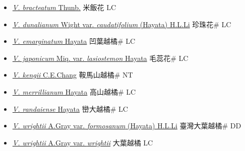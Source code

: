 \begin{itemize}
  \begin{itemize}
        \item[] \href{http://www.theplantlist.org/tpl1.1/search?q=Vaccinium+bracteatum}{\textit{V. bracteatum} Thunb.}   米飯花 LC
        \item[] \href{http://www.theplantlist.org/tpl1.1/search?q=Vaccinium+dunalianum+var.+caudatifolium}{\textit{V. dunalianum} Wight var. \textit{caudatifolium} (Hayata) H.L.Li}   珍珠花\# LC
        \item[] \href{http://www.theplantlist.org/tpl1.1/search?q=Vaccinium+emarginatum}{\textit{V. emarginatum} Hayata}   凹葉越橘\# LC
        \item[] \href{http://www.theplantlist.org/tpl1.1/search?q=Vaccinium+japonicum+var.+lasiostemon}{\textit{V. japonicum} Miq. var. \textit{lasiostemon} Hayata}   毛蕊花\# LC
        \item[] \href{http://www.theplantlist.org/tpl1.1/search?q=Vaccinium+kengii}{\textit{V. kengii} C.E.Chang}   鞍馬山越橘\# NT
        \item[] \href{http://www.theplantlist.org/tpl1.1/search?q=Vaccinium+merrillianum}{\textit{V. merrillianum} Hayata}   高山越橘\# LC
        \item[] \href{http://www.theplantlist.org/tpl1.1/search?q=Vaccinium+randaiense}{\textit{V. randaiense} Hayata}   巒大越橘\# LC
        \item[] \href{http://www.theplantlist.org/tpl1.1/search?q=Vaccinium+wrightii+var.+formosanum}{\textit{V. wrightii} A.Gray var. \textit{formosanum} (Hayata) H.L.Li}   臺灣大葉越橘\# DD
        \item[] \href{http://www.theplantlist.org/tpl1.1/search?q=Vaccinium+wrightii+var.+wrightii}{\textit{V. wrightii} A.Gray var. \textit{wrightii}}   大葉越橘 LC
  \end{itemize}
  \end{itemize}
